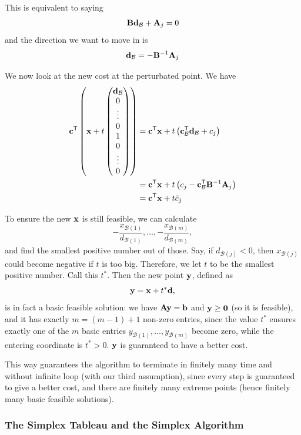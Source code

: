 \documentclass[11pt]{article}
\theoremstyle{definition}
\theoremstyle{remark}
\newcommand{\pqty}[1]{\left(#1\right)}
\newcommand{\pmqty}[1]{\begin{pmatrix}#1\end{pmatrix}}
\newcommand{\transpose}{^{\mathsf{T}}}
\newcommand{\inverse}{^{-1}}
\begin{document}
This is equivalent to saying
\[
    \vb{B} \vb{d}_{\mathcal{B}} + \vb{A}_j = 0
\]
and the direction we want to move in is
\[
    \vb{d}_{\mathcal{B}} = - \vb{B}\inverse \vb{A}_j
\]

We now look at the new cost at the perturbated point. We have
\begin{align*}
    \vb{c}\transpose \pqty{\vb{x} + t \pmqty{\vb{d}_{\mathcal{B}} \\ 0 \\ \vdots \\ 0 \\ 1 \\ 0 \\ \vdots \\ 0}} &= \vb{c}\transpose \vb{x} + t \pqty{\vb{c}_{\mathcal{B}}\transpose \vb{d}_{\mathcal{B}} + c_j} \\
    &= \vb{c}\transpose \vb{x} + t \pqty{c_j - \vb{c}_{\mathcal{B}}\transpose \vb{B}\inverse \vb{A}_j} \\
    &= \vb{c}\transpose \vb{x} + t \bar{c}_j
\end{align*}

To ensure the new \(\vb{x}\) is still feasible, we can calculate
\[
    - \frac{x_{\mathcal{B} \pqty{1}}}{d_{\mathcal{B} \pqty{1}}}, \ldots, - \frac{x_{\mathcal{B} \pqty{m}}}{d_{\mathcal{B} \pqty{m}}},
\]
and find the smallest positive number out of those. Say, if \(d_{\mathcal{B}\pqty{j}} < 0\), then \(x_{\mathcal{B}\pqty{j}}\) could become negative if \(t\) is too big. Therefore, we let \(t\) to be the smallest positive number. Call this \(t^{\ast}\). Then the new point \(\vb{y}\), defined as
\[
    \vb{y} = \vb{x} + t^{\ast} \vb{d},
\]
is in fact a basic feasible solution: we have \(\vb{Ay} = \vb{b}\) and \(\vb{y} \geq \vb{0}\) (so it is feasible), and it has exactly \(m = \pqty{m - 1} + 1\) non-zero entries, since the value \(t^{\ast}\) ensures exactly one of the \(m\) basic entries \(y_{\mathcal{B}\pqty{1}}, \ldots, y_{\mathcal{B}\pqty{m}}\) become zero, while the entering coordinate is \(t^*>0\). \(\vb{y}\) is guaranteed to have a better cost.

This way guarantees the algorithm to terminate in finitely many time and without infinite loop (with our third assumption), since every step is guaranteed to give a better cost, and there are finitely many extreme points (hence finitely many basic feasible solutions).

\subsubsection{The Simplex Tableau and the Simplex Algorithm}
\end{document}
